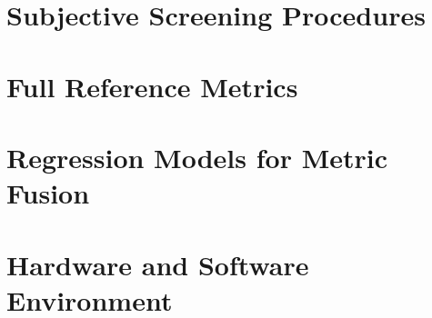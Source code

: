 \documentclass[a4paper, 11pt]{book}
\theoremstyle{definition}
\begin{document}






\printbibliography\titleformat{\chapter}[display]	%
{\normalfont\huge\bfseries}{\chaptertitlename\ \thechapter}{20pt}{\Huge}


\begin{appendix}			%
\chapter{Subjective Screening Procedures}\label{app:subjective-screening}


\chapter{Full Reference Metrics}\label{app:full-ref-metrics}


\chapter{Regression Models for Metric Fusion}\label{app:regression-models}


\chapter{Hardware and Software Environment}\label{app:env}


%

\end{appendix}
\end{document}
